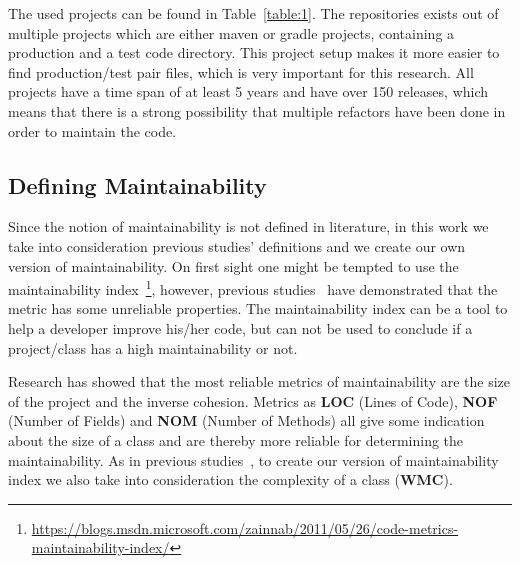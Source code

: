 The used projects can be found in Table~\ref{table:1}. The repositories exists out of multiple projects which are either maven or gradle projects, containing a production and a test code directory. This project setup makes it more easier to find production/test pair files, which is very important for this research. All projects have a time span of at least 5 years and have over 150 releases, which means that there is a strong possibility that multiple refactors have been done in order to maintain the code.


\begin{table}[htb]
    \caption{An overview of the analysed projects}
    \label{table:1}
\end{table}

\subsection{Defining Maintainability}
\label{sec:maint-metric}
Since the notion of maintainability is not defined in literature, in this work we take into consideration previous studies' definitions and we create our own version of maintainability. 
On first sight one might be tempted to use the maintainability index~\footnote{\url{https://blogs.msdn.microsoft.com/zainnab/2011/05/26/code-metrics-maintainability-index/}}, however, previous studies~\cite{sjoberg2012questioning, heitlager2007practical} have demonstrated that the metric has some unreliable properties. The maintainability index can be a tool to help a developer improve his/her code, but can not be used to conclude if a project/class has a high maintainability or not. 

Research has showed \cite{sjoberg2012questioning} that the most reliable metrics of maintainability are the size of the project and the inverse cohesion. Metrics as \textbf{LOC} (Lines of Code), \textbf{NOF} (Number of Fields) and \textbf{NOM} (Number of Methods) all give some indication about the size of a class and are thereby more reliable for determining the maintainability. As in previous studies~\cite{citationneeded}, to create our version of maintainability index we also take into consideration the complexity of a class (\textbf{WMC}).

